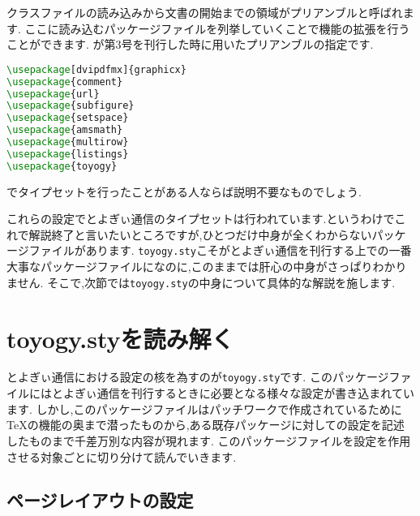 クラスファイルの読み込みから文書の開始までの領域がプリアンブルと呼ばれます.
ここに読み込むパッケージファイルを列挙していくことで機能の拡張を行うことができます.
が第3号を刊行した時に用いたプリアンブルの指定です.
\begin{lstlisting}[caption=プリアンブル,label=lis:preamble,language=tex]
\usepackage[dvipdfmx]{graphicx}
\usepackage{comment}
\usepackage{url}
\usepackage{subfigure}
\usepackage{setspace}
\usepackage{amsmath}
\usepackage{multirow}
\usepackage{listings}
\usepackage{toyogy}
\end{lstlisting}
{\pLaTeX}でタイプセットを行ったことがある人ならば説明不要なものでしょう.

これらの設定でとよぎぃ通信のタイプセットは行われています.というわけでこれで解説終了と言いたいところですが,ひとつだけ中身が全くわからないパッケージファイルがあります.
\texttt{toyogy.sty}こそがとよぎぃ通信を刊行する上での一番大事なパッケージファイルになのに,このままでは肝心の中身がさっぱりわかりません.
そこで,次節では\texttt{toyogy.sty}の中身について具体的な解説を施します.
\section{toyogy.styを読み解く}

とよぎぃ通信における設定の核を為すのが\texttt{toyogy.sty}です.
このパッケージファイルにはとよぎぃ通信を刊行するときに必要となる様々な設定が書き込まれています.
しかし,このパッケージファイルはパッチワークで作成されているために{\TeX}の機能の奥まで潜ったものから,ある既存パッケージに対しての設定を記述したものまで千差万別な内容が現れます.
このパッケージファイルを設定を作用させる対象ごとに切り分けて読んでいきます.

\subsection{ページレイアウトの設定}

